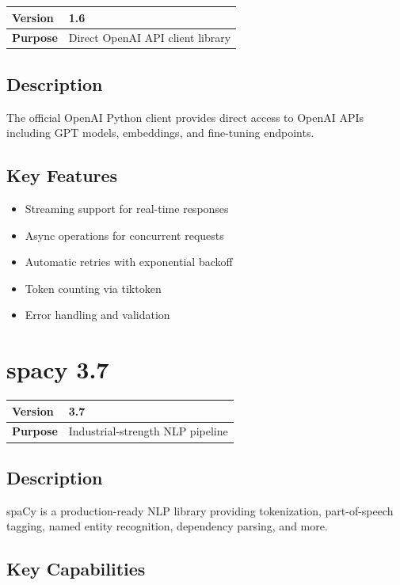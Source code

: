 \documentclass[12pt,a4paper]{report}
\begin{document}
\begin{tabular}{|p{4cm}|p{10cm}|}
\hline
\textbf{Version} & 1.6 \\
\hline
\textbf{Purpose} & Direct OpenAI API client library \\
\hline
\end{tabular}

\subsection{Description}

The official OpenAI Python client provides direct access to OpenAI APIs including GPT models, embeddings, and fine-tuning endpoints.

\subsection{Key Features}

\begin{itemize}
    \item Streaming support for real-time responses
    \item Async operations for concurrent requests
    \item Automatic retries with exponential backoff
    \item Token counting via tiktoken
    \item Error handling and validation
\end{itemize}

\section{spacy 3.7}

\begin{tabular}{|p{4cm}|p{10cm}|}
\hline
\textbf{Version} & 3.7 \\
\hline
\textbf{Purpose} & Industrial-strength NLP pipeline \\
\hline
\end{tabular}

\subsection{Description}

spaCy is a production-ready NLP library providing tokenization, part-of-speech tagging, named entity recognition, dependency parsing, and more.

\subsection{Key Capabilities}
\end{document}
